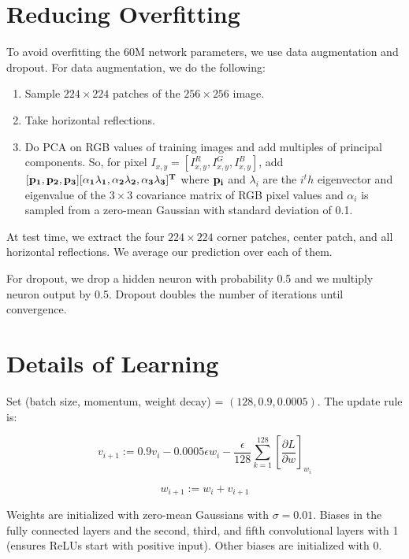 \documentclass[a4paper]{article}
\begin{document}
\section{Reducing Overfitting}
To avoid overfitting the 60M network parameters, we use data augmentation and
dropout. For data augmentation, we do the following:

\begin{enumerate}
  \item Sample $224 \times 224$ patches of the $256 \times 256$ image.
  \item Take horizontal reflections.
  \item Do PCA on RGB values of training images and add multiples of principal
  components. So, for pixel $I_{x, y} = [I_{x, y}^R, I_{x, y}^G, I_{x, y}^B]$,
  add $[\bf{p_1}, \bf{p_2}, \bf{p_3}][\alpha_{1} \lambda_1, \alpha_2 \lambda_2,
  \alpha_3 \lambda_3]^T$ where $\bf{p_i}$ and $\lambda_i$ are the $i^th$
  eigenvector and eigenvalue of the $3 \times 3$ covariance matrix of RGB pixel
  values and $\alpha_i$ is sampled from a zero-mean Gaussian with standard
  deviation of 0.1.
\end{enumerate}

At test time, we extract the four $224 \times 224$ corner patches, center patch,
and all horizontal reflections. We average our prediction over each of them.

For dropout, we drop a hidden neuron with probability 0.5 and we multiply neuron
output by 0.5. Dropout doubles the number of iterations until convergence.

\section{Details of Learning}
Set (batch size, momentum, weight decay) = $(128, 0.9, 0.0005)$. The update rule
is:

\begin{equation}
  v_{i+1} := 0.9 v_i - 0.0005 \epsilon w_i - \frac{\epsilon}{128}
  \sum_{k=1}^{128}{[\frac{\partial L}{\partial w}]_{w_i}}
\end{equation}

\begin{equation}
  w_{i+1} := w_i + v_{i+1}
\end{equation}

Weights are initialized with zero-mean Gaussians with $\sigma = 0.01$. Biases in
the fully connected layers and the second, third, and fifth convolutional layers
with 1 (ensures ReLUs start with positive input). Other biases are initialized
with 0.
\end{document}
